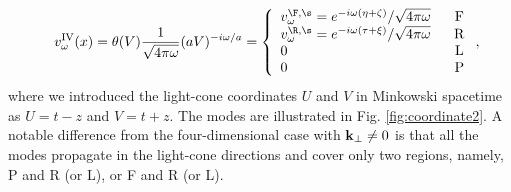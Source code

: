 \documentclass[aps,prd,preprintnumbers,nofootinbib,showpacs]{revtex4}%
\begin{document}
\begin{widetext}
\begin{eqnarray}
&&v_{\omega}^{\rm IV}(x)=\theta (V) {1 \over \sqrt{4\pi \omega}} (aV)^{-i{\omega / a}}=
\left\{
\begin{array}{lc}
v_{\omega}^{\F,\s}={e^{-i\omega(\eta+\zeta)}/ \sqrt{4\pi \omega}} 
 & ~~{\rm F}
\\
v^{\R,\s}_{\omega}={e^{-i\omega(\tau+\xi)}/ \sqrt{4\pi \omega}}& ~~{\rm R}
\\
0& ~~{\rm L}
\\
0& ~~{\rm P}
\end{array}
\right.,
\nonumber
\end{eqnarray}
where we introduced the light-cone coordinates $U$ and $V$ in Minkowski spacetime as 
$U=t-z$ and $V=t+z$. The modes are illustrated in Fig. \ref{fig:coordinate2}.
A notable difference from the four-dimensional case with ${\bold k}_{\perp} \neq 0$ is that
all the modes propagate in the light-cone directions and cover only two regions, namely,
P and R (or L), or F and R (or L). 


\end{widetext}
\end{document}
